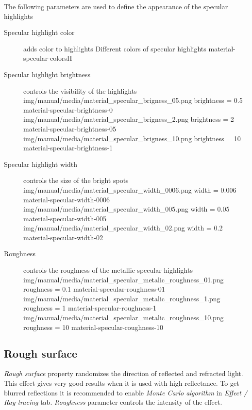 \pagebreak
The following parameters are used to define the appearance of the specular highlights
\begin{description}
	\item[Specular highlight color] adds color to highlights
	{Different colors of specular highlights}
	{material-specular-colors}{H}

	\item[Specular highlight brightness] controls the visibility of the highlights
	\threeImagesWithTwoCaptionsFullWidth
	{img/manual/media/material_specular_brigness_05.png}
	{brightness = 0.5}
	{material-specular-brightness-0}
	{img/manual/media/material_specular_brigness_2.png}
	{brightness = 2}
	{material-specular-brightness-05}
	{img/manual/media/material_specular_brigness_10.png}
	{brightness = 10}
	{material-specular-brightness-1}
	
	\item[Specular highlight width] controls the size of the bright spots
	\threeImagesWithTwoCaptionsFullWidth
	{img/manual/media/material_specular_width_0006.png}
	{width = 0.006}
	{material-specular-width-0006}
	{img/manual/media/material_specular_width_005.png}
	{width = 0.05}
	{material-specular-width-005}
	{img/manual/media/material_specular_width_02.png}
	{width = 0.2}
	{material-specular-width-02}
	
	\pagebreak
	\item[Roughness] controls the roughness of the metallic specular highlights
	\threeImagesWithTwoCaptionsFullWidth
	{img/manual/media/material_specular_metalic_roughness_01.png}
	{roughness = 0.1}
	{material-specular-roughness-01}
	{img/manual/media/material_specular_metalic_roughness_1.png}
	{roughness = 1}
	{material-specular-roughness-1}
	{img/manual/media/material_specular_metalic_roughness_10.png}
	{roughness = 10}
	{material-specular-roughness-10}	
		
\end{description}

\subsection{Rough surface}\label{materials-roughness}

\emph{Rough surface} property randomizes the direction of reflected and refracted light. This effect gives very good results when it is used with high reflectance. To get blurred reflections it is recommended to enable \emph{Monte Carlo algorithm} in \emph{Effect / Ray-tracing} tab. \emph{Roughness} parameter controls the intensity of the effect.

